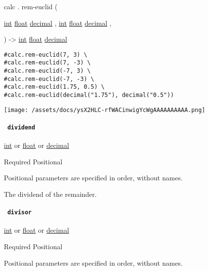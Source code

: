 calc { . } { rem-euclid } (

{ \href{/docs/reference/foundations/int/}{int}
\href{/docs/reference/foundations/float/}{float}
\href{/docs/reference/foundations/decimal/}{decimal} , } {
\href{/docs/reference/foundations/int/}{int}
\href{/docs/reference/foundations/float/}{float}
\href{/docs/reference/foundations/decimal/}{decimal} , }

) -\textgreater{} \href{/docs/reference/foundations/int/}{int}
\href{/docs/reference/foundations/float/}{float}
\href{/docs/reference/foundations/decimal/}{decimal}

\begin{verbatim}
#calc.rem-euclid(7, 3) \
#calc.rem-euclid(7, -3) \
#calc.rem-euclid(-7, 3) \
#calc.rem-euclid(-7, -3) \
#calc.rem-euclid(1.75, 0.5) \
#calc.rem-euclid(decimal("1.75"), decimal("0.5"))
\end{verbatim}

\texttt{[image: /assets/docs/ysX2HLC-rfWACinwigYcWgAAAAAAAAAA.png]}

\paragraph{\texorpdfstring{\texttt{\ dividend\ }}{ dividend }}\label{functions-rem-euclid-dividend}

\href{/docs/reference/foundations/int/}{int} {or}
\href{/docs/reference/foundations/float/}{float} {or}
\href{/docs/reference/foundations/decimal/}{decimal}

{Required} {{ Positional }}

\phantomsection\label{functions-rem-euclid-dividend-positional-tooltip}
Positional parameters are specified in order, without names.

The dividend of the remainder.

\paragraph{\texorpdfstring{\texttt{\ divisor\ }}{ divisor }}\label{functions-rem-euclid-divisor}

\href{/docs/reference/foundations/int/}{int} {or}
\href{/docs/reference/foundations/float/}{float} {or}
\href{/docs/reference/foundations/decimal/}{decimal}

{Required} {{ Positional }}

\phantomsection\label{functions-rem-euclid-divisor-positional-tooltip}
Positional parameters are specified in order, without names.

